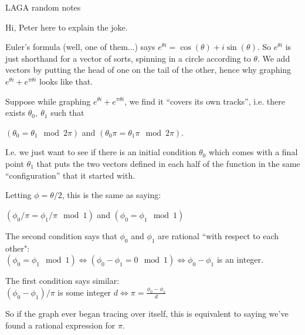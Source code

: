 \documentclass{article}
\newcommand{\hsp}[1][5]{\hspace{0.#1 cm}}
\newcommand{\hcm}[1][1]{\hspace{#1 cm}}
\newcommand{\dspt}{\displaystyle}
\begin{document}
\begin{center}
LAGA random notes
\end{center}
\begin{flushleft}

Hi, Peter here to explain the joke.\\\hcm

Euler's formula (well, one of them...) says $e^{\theta i} = \cos(\theta) + i\sin(\theta)$. So $e^{\theta i}$ is just shorthand for a vector of sorts, spinning in a circle according to $\theta$. We add vectors by putting the head of one on the tail of the other, hence why graphing $\dspt e^{\theta i} + e^{\pi\theta i}$ looks like that.\\\hcm

Suppose while graphing $\dspt e^{\theta i} + e^{\pi\theta i}$, we find it ``covers its own tracks'', i.e. there exists $\theta_0,\ \theta_1$ such that\\\hcm 

 $(\theta_0 = \theta_1 \mod 2\pi)$ and $(\theta_0\pi = \theta_1\pi \mod 2\pi)$. \\\hcm

I.e. we just want to see if there is an initial condition $\theta_0$ which comes with a final point $\theta_1$ that puts the two vectors defined in each half of the function in the same ``configuration'' that it started with.\\\hcm

Letting $\phi = \theta/2$, this is the same as saying:\\\hcm

$(\phi_0/\pi = \phi_1/\pi \mod 1)$ and $(\phi_0 = \phi_1 \mod 1)$\\\hcm

The second condition says that $\phi_0$ and $\phi_1$ are rational ``with respect to each other":\\\hcm $(\phi_0 = \phi_1 \mod 1) \iff (\phi_0 - \phi_1 = 0 \mod 1) \iff \phi_0 - \phi_1$ is an integer.\\\hsp

The first condition says similar:\\\hcm
$(\phi_0 - \phi_1)/\pi$ is some integer $\dspt d \iff \pi = \frac{\phi_0 - \phi_1}{d}$\\\hcm

So if the graph ever began tracing over itself, this is equivalent to saying we've found a rational expression for $\pi$. 


\end{flushleft}
\end{document}
